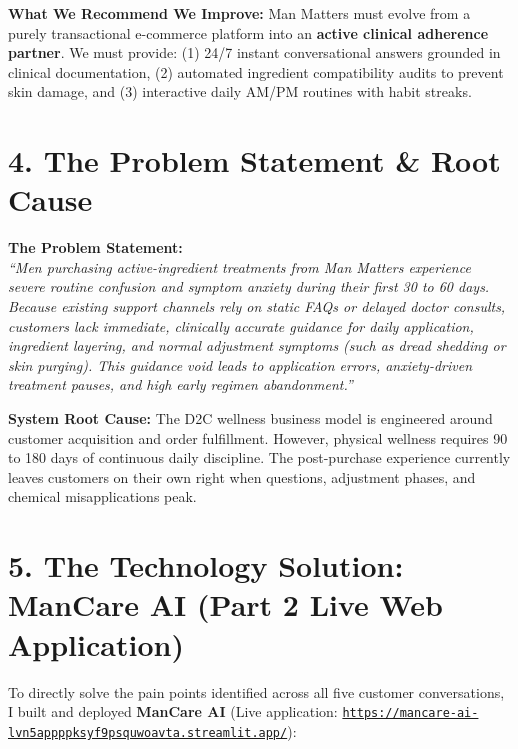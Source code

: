 \documentclass[11pt,a4paper]{article}
\begin{document}
\textbf{What We Recommend We Improve:}
Man Matters must evolve from a purely transactional e-commerce platform into an \textbf{active clinical adherence partner}. We must provide: (1) 24/7 instant conversational answers grounded in clinical documentation, (2) automated ingredient compatibility audits to prevent skin damage, and (3) interactive daily AM/PM routines with habit streaks.

\section*{4. The Problem Statement \& Root Cause}
\begin{tcolorbox}[colback=alertbg, colframe=alertborder, arc=2mm, left=8pt, right=8pt, top=6pt, bottom=6pt]
\textbf{\color{branddark}The Problem Statement:}\\
\textit{``Men purchasing active-ingredient treatments from Man Matters experience severe routine confusion and symptom anxiety during their first 30 to 60 days. Because existing support channels rely on static FAQs or delayed doctor consults, customers lack immediate, clinically accurate guidance for daily application, ingredient layering, and normal adjustment symptoms (such as dread shedding or skin purging). This guidance void leads to application errors, anxiety-driven treatment pauses, and high early regimen abandonment.''}
\end{tcolorbox}

\textbf{System Root Cause:} The D2C wellness business model is engineered around customer acquisition and order fulfillment. However, physical wellness requires 90 to 180 days of continuous daily discipline. The post-purchase experience currently leaves customers on their own right when questions, adjustment phases, and chemical misapplications peak.

\section*{5. The Technology Solution: ManCare AI (Part 2 Live Web Application)}
To directly solve the pain points identified across all five customer conversations, I built and deployed \textbf{ManCare AI} (Live application: \href{https://mancare-ai-lvn5appppksyf9psquwoavta.streamlit.app/}{\texttt{https://mancare-ai-lvn5appppksyf9psquwoavta.streamlit.app/}}):
\end{document}

